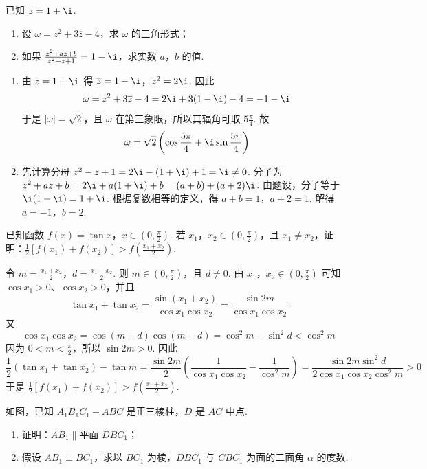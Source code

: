 \begin{problem}
已知 \(z = 1 + \i\).

\begin{enumerate}
\item 设 \(\omega = z^2 + 3\overline{z} - 4\)，求 \(\omega\) 的三角形式；
\item 如果 \(\frac{z^{2}+az+b}{z^{2}-z+1}=1-\i\)，求实数 \(a\)，\(b\) 的值.
\end{enumerate}
\end{problem}

\begin{solution}
\begin{enumerate}
\item 由 \(z=1+\i\) 得 \(\overline{z}=1-\i\)，\(z^2=2\i\). 因此
\[
\omega=z^2+3\overline{z}-4
=2\i+3(1-\i)-4=-1-\i
\]
于是 \(|\omega|=\sqrt{2}\)，且 \(\omega\) 在第三象限，所以其辐角可取 \(5\frac{\pi}{4}\). 故
\[
\omega=\sqrt{2}\left(\cos\frac{5\pi}{4}+\i\sin\frac{5\pi}{4}\right)
\]
\item 先计算分母
\(z^2-z+1=2\i-(1+\i)+1=\i\neq0\).
分子为 \(z^2+az+b=2\i+a(1+\i)+b=(a+b)+(a+2)\i\). 由题设，分子等于 \(\i(1-\i)=1+\i\). 根据复数相等的定义，得 \(a+b=1\)，\(a+2=1\).
解得 \(a=-1\)，\(b=2\).
\end{enumerate}
\end{solution}

\begin{problem}
已知函数 \(f(x) = \tan x\)，\(x \in \left(0, \frac{\pi}{2}\right)\). 若 \(x_1\)，\(x_2 \in \left(0, \frac{\pi}{2}\right)\)，且 \(x_1 \neq x_2 \)，证明：\(\frac{1}{2}\left[f(x_1) + f(x_2)\right] > f\left(\frac{x_1 + x_2}{2}\right) \).
\end{problem}

\begin{solution}
令 \(m=\frac{x_1+x_2}{2}\)，\(d=\frac{x_1-x_2}{2}\).
则 \(m\in(0,\frac{\pi}{2})\)，且 \(d\neq0\). 由 \(x_1\)，\(x_2\in(0,\frac{\pi}{2})\) 可知 \(\cos x_1>0\)、\(\cos x_2>0\)，并且
\[
\tan x_1+\tan x_2
=\frac{\sin(x_1+x_2)}{\cos x_1\cos x_2}
=\frac{\sin 2m}{\cos x_1\cos x_2}
\]
又
\[
\cos x_1\cos x_2
=\cos(m+d)\cos(m-d)
=\cos^2m-\sin^2d<\cos^2m
\]
因为 \(0<m<\frac{\pi}{2}\)，所以 \(\sin2m>0\). 因此
\[
\frac12\left(\tan x_1+\tan x_2\right)-\tan m
=\frac{\sin2m}{2}\left(\frac{1}{\cos x_1\cos x_2}-\frac{1}{\cos^2m}\right)
=\frac{\sin2m\sin^2d}{2\cos x_1\cos x_2\cos^2m}>0
\]
于是 \(\frac12\left[f(x_1)+f(x_2)\right]>f\left(\frac{x_1+x_2}{2}\right)\).
\end{solution}

\begin{problem}
如图，已知 \(A_{1}B_{1}C_{1} - ABC\) 是正三棱柱，\(D\) 是 \(AC\) 中点.

\begin{enumerate}
\item 证明：\(AB_{1} \parallel \text{平面 } DBC_{1}\)；
\item 假设 \(AB_{1} \perp BC_{1}\)，求以 \(BC_{1}\) 为棱，\(DBC_{1}\) 与 \(CBC_{1}\) 为面的二面角 \(\alpha\) 的度数.
\end{enumerate}

\end{problem}

